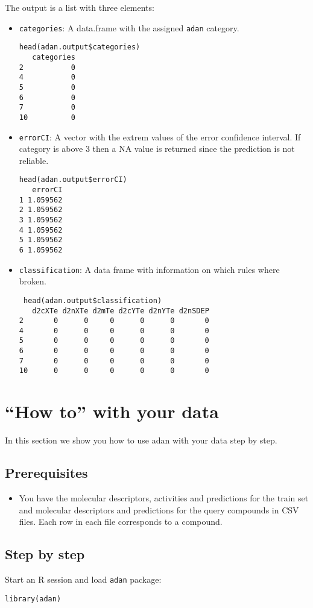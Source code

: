 \documentclass[a4paper]{article}
\begin{document}
The output is a list with three elements:
\begin{itemize}
\item \texttt{categories}: A data.frame with the assigned \texttt{adan} category.
\begin{verbatim}
head(adan.output$categories)
   categories
2           0
4           0
5           0
6           0
7           0
10          0
\end{verbatim}
\item \texttt{errorCI}: A vector with the extrem values of the error confidence interval. If category is above 3 then a NA value is returned since the prediction is not reliable.
\begin{verbatim}
head(adan.output$errorCI)
   errorCI
1 1.059562
2 1.059562
3 1.059562
4 1.059562
5 1.059562
6 1.059562
\end{verbatim}
\item \texttt{classification}: A data frame with information on which rules where broken.
\begin{verbatim}
 head(adan.output$classification)
   d2cXTe d2nXTe d2mTe d2cYTe d2nYTe d2nSDEP
2       0      0     0      0      0       0
4       0      0     0      0      0       0
5       0      0     0      0      0       0
6       0      0     0      0      0       0
7       0      0     0      0      0       0
10      0      0     0      0      0       0
\end{verbatim}
\end{itemize}


\section{``How to'' with your data}

In this section we show you how to use adan with your data step by step.

\subsection*{Prerequisites}
\begin{itemize}
\item You have the molecular descriptors, activities and predictions for the train set and
molecular descriptors and predictions for the query compounds in CSV files. Each row in each file corresponds to a compound.
\end{itemize}

\subsection*{Step by step}
Start an R session and load \texttt{adan} package:
\begin{verbatim}
library(adan)
\end{verbatim}
\end{document}
